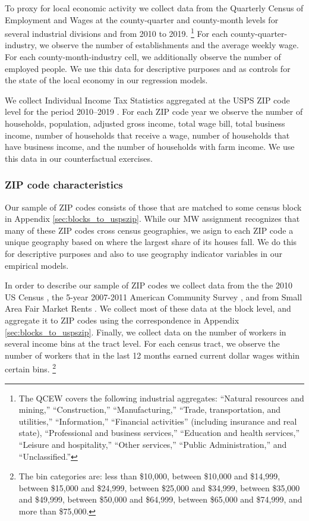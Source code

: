 To proxy for local economic activity we collect data from the 
Quarterly Census of Employment and Wages \parencite[QCEW;][]{QCEW} 
at the county-quarter and county-month levels for several industrial divisions 
and from 2010 to 2019.%
\footnote{The QCEW covers the following industrial aggregates: 
``Natural resources and mining,'' ``Construction,'' ``Manufacturing,'' 
``Trade, transportation, and utilities,'' ``Information,'' 
``Financial activities'' (including insurance and real state), 
``Professional and business services,'' ``Education and health services,'' 
``Leisure and hospitality,'' ``Other services,'' ``Public Administration,''
and ``Unclassified.''}
For each county-quarter-industry, we observe the number of establishments and 
the average weekly wage.
For each county-month-industry cell, we additionally observe the number of 
employed people.
We use this data for descriptive purposes and as controls for the state of 
the local economy in our regression models.

We collect Individual Income Tax Statistics aggregated at the USPS ZIP code 
level for the period 2010--2019 \parencite{IRS}.
For each ZIP code year we observe the number of households, population, adjusted 
gross income, total wage bill, total business income, number of households that 
receive a wage, number of households that have business income, and the number 
of households with farm income.
We use this data in our counterfactual exercises.

\subsubsection{ZIP code characteristics}
\label{sec:data_other_cross}

Our sample of ZIP codes consists of those that are matched to some census block 
in Appendix \ref{sec:blocks_to_uspszip}.
While our MW assignment recognizes that many of these ZIP codes cross census 
geographies, we asign to each ZIP code a unique geography based on where the 
largest share of its houses fall.
We do this for descriptive purposes and also to use geography indicator 
variables in our empirical models.

In order to describe our sample of ZIP codes we collect data from the the 
2010 US Census \parencite{CensusDecennial}, 
the 5-year 2007-2011 American Community Survey \parencite[ACS;][]{CensusACS}, and 
from Small Area Fair Market Rents \parencite[SAFMR;][]{hudSAFMR}.
We collect most of these data at the block level, and aggregate it to ZIP codes
using the correspondence in Appendix \ref{sec:blocks_to_uspszip}.
Finally, we collect data on the number of workers in several income bins at
the tract level.
For each census tract, we observe the number of workers that in the last 12 
months earned current dollar wages within certain bins.%
\footnote{The bin categories are: 
less than \$10,000, between \$10,000 and \$14,999, between \$15,000 and \$24,999, 
between \$25,000 and \$34,999, between \$35,000 and \$49,999, between \$50,000 and \$64,999,
between \$65,000 and \$74,999, and more than \$75,000.}

